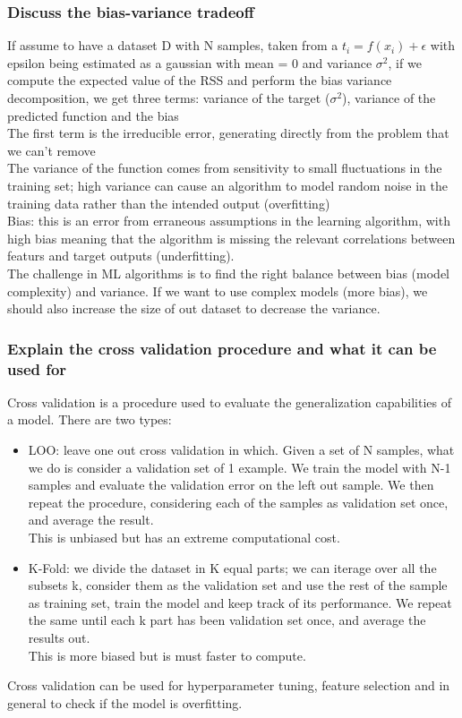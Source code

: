 \subsubsection{Discuss the bias-variance tradeoff}
    If assume to have a dataset D with N samples, taken from a $t_i = f(x_i) + \epsilon$ with epsilon being estimated as a gaussian with mean = 0 and variance $\sigma ^2$, if we compute the expected value of the RSS and perform the bias variance decomposition, we get three terms: variance of the target ($\sigma^2$), variance of the predicted function and the bias\\
    The first term is the irreducible error, generating directly from the problem that we can't remove\\
    The variance of the function comes from sensitivity to small fluctuations in the training set; high variance can cause an algorithm to model random noise in the training data rather than the intended output (overfitting)\\
    Bias: this is an error from erraneous assumptions in the learning algorithm, with high bias meaning that the algorithm is missing the relevant correlations between featurs and target outputs (underfitting).\\
    The challenge in ML algorithms is to find the right balance between bias (model complexity) and variance. If we want to use complex models (more bias), we should also increase the size of out dataset to decrease the variance.  

\subsubsection{Explain the cross validation procedure and what it can be used for}
    Cross validation is a procedure used to evaluate the generalization capabilities of a model. There are two types:
    \begin{itemize}
        \item LOO: leave one out cross validation in which. Given a set of N samples, what we do is consider a validation set of 1 example. We train the model with N-1 samples and evaluate the validation error on the left out sample. We then repeat the procedure, considering each of the samples as validation set once, and average the result.\\
        This is unbiased but has an extreme computational cost.
        \item K-Fold: we divide the dataset in K equal parts; we can iterage over all the subsets k, consider them as the validation set and use the rest of the sample as training set, train the model and keep track of its performance. We repeat the same until each k part has been validation set once, and average the results out.\\
        This is more biased but is must faster to compute.
    \end{itemize}
    Cross validation can be used for hyperparameter tuning, feature selection and in general to check if the model is overfitting.

